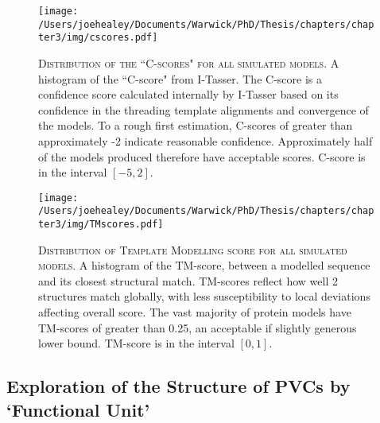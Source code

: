 \begin{figure}[p]
\centering
{}
\texttt{[image: /Users/joehealey/Documents/Warwick/PhD/Thesis/chapters/chapter3/img/cscores.pdf]}
	\captionsetup{singlelinecheck=off, justification=justified, font=footnotesize, aboveskip=7pt}
	\caption[I-Tasser model accuracy distribution - C-score]{\textsc{\normalsize Distribution of the ``C-scores" for all simulated models.}\vspace{0.1cm} \newline A histogram of the ``C-score" from I-Tasser. The C-score is a confidence score calculated internally by I-Tasser based on its confidence in the threading template alignments and convergence of the models. To a rough first estimation, C-scores of greater than approximately -2 indicate reasonable confidence. Approximately half of the models produced therefore have acceptable scores. C-score is in the interval $[-5, 2]$.}
	\label{cscorehist}
\end{figure}
\begin{figure}[p]
\centering
{}
\texttt{[image: /Users/joehealey/Documents/Warwick/PhD/Thesis/chapters/chapter3/img/TMscores.pdf]}
	\captionsetup{singlelinecheck=off, justification=justified, font=footnotesize, aboveskip=7pt}
	\caption[I-Tasser model accuracy distribution TM-score]{\textsc{\normalsize Distribution of Template Modelling score for all simulated models.}\vspace{0.1cm} \newline A histogram of the TM-score, between a modelled sequence and its closest structural match. TM-scores reflect how well 2 structures match globally, with less susceptibility to local deviations affecting overall score. The vast majority of protein models have TM-scores of greater than 0.25, an acceptable if slightly generous lower bound. TM-score is in the interval $[0,1]$.}
	\label{tmscorehist}
\end{figure}



\clearpage
\subsection{Exploration of the Structure of PVCs by `Functional Unit'}

